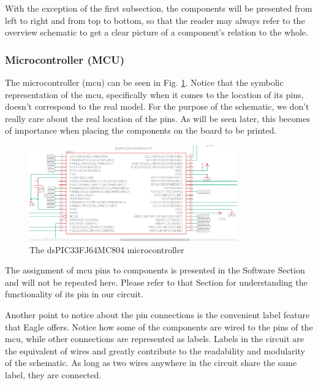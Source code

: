 With the exception of the first subsection, the components will be presented from left to right and from top to bottom, so that the reader may always refer to the overview schematic to get a clear picture of a component's relation to the whole.

\FloatBarrier
\vspace{1cm}

\subsubsection{Microcontroller (MCU)}

The microcontroller (mcu) can be seen in Fig. \ref{fig:mcuL}.
Notice that the symbolic representation of the mcu, specifically when it comes to the location of its pins, doesn't correspond to the real model. For the purpose of the schematic, we don't really care about the real location of the pins. As will be seen later, this becomes of importance when placing the components on the board to be printed.

\begin{figure}[htb]
    \centering
    \includegraphics[width=0.8\textwidth]{figures/hardware/MCU.PNG}
    \caption{The dsPIC33FJ64MC804 microcontroller}
    \label{fig:mcuL}
\end{figure}

\FloatBarrier

The assignment of mcu pins to components is presented in the Software Section and will not be repeated here. Please refer to that Section for understanding the functionality of its pin in our circuit.

Another point to notice about the pin connections is the convenient label feature that Eagle offers. Notice how some of the components are wired to the pins of the mcu, while other connections are represented as labels. Labels in the circuit are the equivalent of wires and greatly contribute to the readability and modularity of the schematic. As long as two wires anywhere in the circuit share the same label, they are connected.

